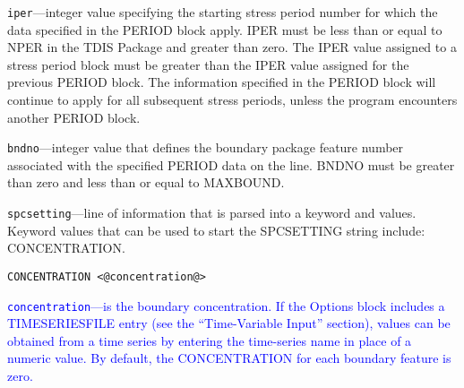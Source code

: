 \begin{description}
\item \texttt{iper}---integer value specifying the starting stress period number for which the data specified in the PERIOD block apply.  IPER must be less than or equal to NPER in the TDIS Package and greater than zero.  The IPER value assigned to a stress period block must be greater than the IPER value assigned for the previous PERIOD block.  The information specified in the PERIOD block will continue to apply for all subsequent stress periods, unless the program encounters another PERIOD block.

\item \texttt{bndno}---integer value that defines the boundary package feature number associated with the specified PERIOD data on the line. BNDNO must be greater than zero and less than or equal to MAXBOUND.

\item \texttt{spcsetting}---line of information that is parsed into a keyword and values.  Keyword values that can be used to start the SPCSETTING string include: CONCENTRATION.

\begin{lstlisting}[style=blockdefinition]
CONCENTRATION <@concentration@>
\end{lstlisting}

\item \textcolor{blue}{\texttt{concentration}---is the boundary concentration. If the Options block includes a TIMESERIESFILE entry (see the ``Time-Variable Input'' section), values can be obtained from a time series by entering the time-series name in place of a numeric value. By default, the CONCENTRATION for each boundary feature is zero.}

\end{description}

